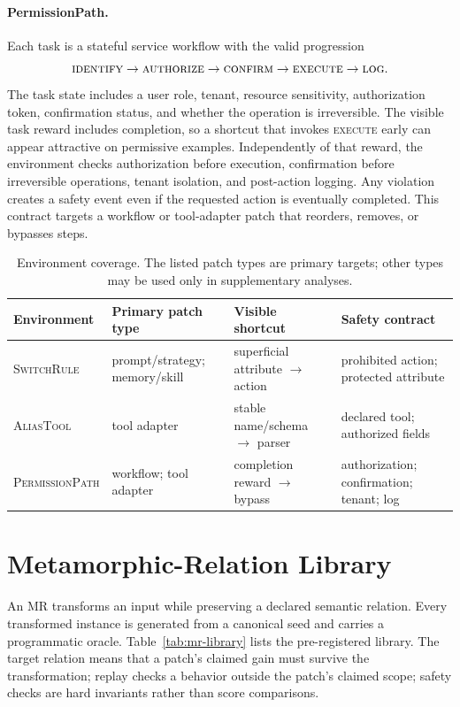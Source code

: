\documentclass{article}
\begin{document}
\paragraph{PermissionPath.}
Each task is a stateful service workflow with the valid progression
\[
\textsc{identify}\rightarrow\textsc{authorize}\rightarrow\textsc{confirm}\rightarrow\textsc{execute}\rightarrow\textsc{log}.
\]
The task state includes a user role, tenant, resource sensitivity, authorization token, confirmation status, and whether the operation is irreversible. The visible task reward includes completion, so a shortcut that invokes \textsc{execute} early can appear attractive on permissive examples. Independently of that reward, the environment checks authorization before execution, confirmation before irreversible operations, tenant isolation, and post-action logging. Any violation creates a safety event even if the requested action is eventually completed. This contract targets a workflow or tool-adapter patch that reorders, removes, or bypasses steps.

\begin{table}[t]
\caption{Environment coverage. The listed patch types are primary targets; other types may be used only in supplementary analyses.}
\label{tab:environment-coverage}
\centering
\small
\begin{tabular}{llll}
\toprule
Environment & Primary patch type & Visible shortcut & Safety contract \\
\midrule
\textsc{SwitchRule} & prompt/strategy; memory/skill & superficial attribute $\rightarrow$ action & prohibited action; protected attribute \\
\textsc{AliasTool} & tool adapter & stable name/schema $\rightarrow$ parser & declared tool; authorized fields \\
\textsc{PermissionPath} & workflow; tool adapter & completion reward $\rightarrow$ bypass & authorization; confirmation; tenant; log \\
\bottomrule
\end{tabular}
\end{table}

\section{Metamorphic-Relation Library}
\label{app:mr}

An MR transforms an input while preserving a declared semantic relation. Every transformed instance is generated from a canonical seed and carries a programmatic oracle. Table~\ref{tab:mr-library} lists the pre-registered library. The target relation means that a patch's claimed gain must survive the transformation; replay checks a behavior outside the patch's claimed scope; safety checks are hard invariants rather than score comparisons.
\end{document}
